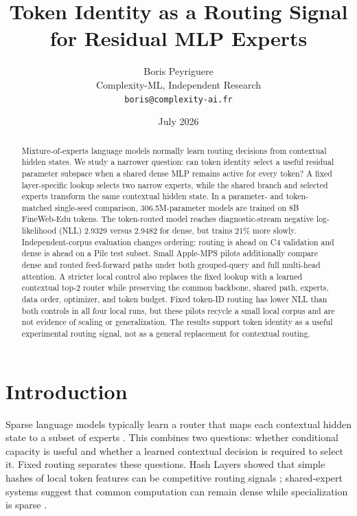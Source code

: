 \documentclass[10pt,twocolumn]{article}
\title{\textbf{Token Identity as a Routing Signal\\for Residual MLP Experts}}
\author{
  Boris Peyriguere\\
  Complexity-ML, Independent Research\\
  \texttt{boris@complexity-ai.fr}
}
\date{July 2026}
\newcommand{\trmodel}{token-routed}
\begin{document}
\maketitle

\begin{abstract}
Mixture-of-experts language models normally learn routing decisions from
contextual hidden states. We study a narrower question: can token identity
select a useful residual parameter subspace when a shared dense MLP remains
active for every token? A fixed layer-specific lookup selects two narrow
experts, while the shared branch and selected experts transform the same
contextual hidden state. In a parameter- and token-matched single-seed
comparison, 306.5M-parameter models are trained on 8B FineWeb-Edu tokens. The
\trmodel{} model reaches diagnostic-stream negative log-likelihood (NLL)
2.9329 versus 2.9482 for dense, but trains 21\% more slowly. Independent-corpus
evaluation changes ordering: routing is ahead on C4 validation and dense is
ahead on a Pile test subset. Small Apple-MPS pilots additionally compare dense
and routed feed-forward paths under both grouped-query and full multi-head
attention. A stricter local control also replaces the fixed lookup with a
learned contextual top-2 router while preserving the common backbone, shared
path, experts, data order, optimizer, and token budget. Fixed token-ID routing
has lower NLL than both controls in all four local runs, but these pilots
recycle a small local corpus and are not evidence of scaling or
generalization. The results support token identity as a useful experimental
routing signal, not as a general replacement for contextual routing.
\end{abstract}

\section{Introduction}

Sparse language models typically learn a router that maps each contextual
hidden state to a subset of experts
\citep{shazeer2017outrageously,fedus2022switch,jiang2024mixtral}. This combines
two questions: whether conditional capacity is useful and whether a learned
contextual decision is required to select it. Fixed routing separates these
questions. Hash Layers showed that simple hashes of local token features can
be competitive routing signals \citep{roller2021hash}; shared-expert systems
suggest that common computation can remain dense while specialization is
sparse \citep{dai2024deepseekmoe}.
\end{document}
